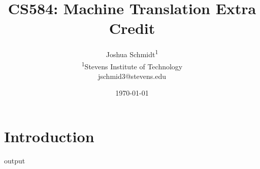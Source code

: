 \documentclass{article}
\title{CS584: Machine Translation Extra Credit} %
\author{
Joshua Schmidt\textsuperscript{1}\\
\textsuperscript{1}{Stevens Institute of Technology}\\
jschmid3@stevens.edu
}
\date{\today}
\begin{document}
\maketitle

\section{Introduction}

output

\begin{footnotesize}

% 
\end{footnotesize}
\end{document}
